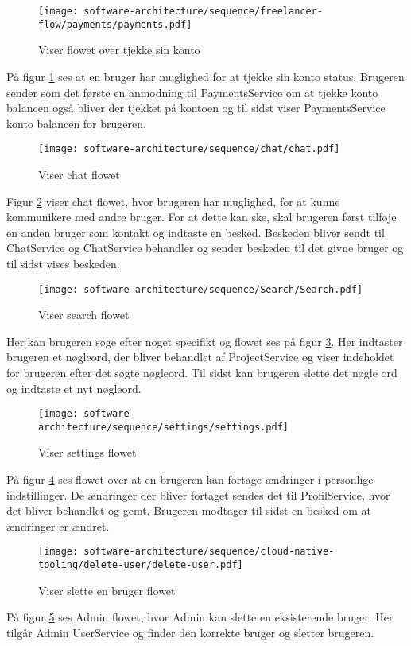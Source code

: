 \begin{figure}[H]
    \centering
\texttt{[image: software-architecture/sequence/freelancer-flow/payments/payments.pdf]}
\caption{Viser flowet over tjekke sin konto}
\label{fig:balance}
\end{figure}
På figur \ref{fig:balance} ses at en bruger har muglighed for at tjekke sin konto status. Brugeren sender som det første en anmodning til PaymentsService om at tjekke konto balancen også bliver der tjekket på kontoen og til sidst viser PaymentsService konto balancen for brugeren.
\begin{figure}[H]
    \centering
\texttt{[image: software-architecture/sequence/chat/chat.pdf]}
\caption{Viser chat flowet}
\label{fig:selectFriend}
\end{figure}
Figur \ref{fig:selectFriend} viser chat flowet, hvor brugeren har muglighed, for at kunne kommunikere med andre bruger. For at dette kan ske, skal brugeren først tilføje en anden bruger som kontakt og indtaste en besked. Beskeden bliver sendt til ChatService og ChatService behandler og sender beskeden til det givne bruger og til sidst vises beskeden. 

\begin{figure}[H]
    \centering
\texttt{[image: software-architecture/sequence/Search/Search.pdf]}
\caption{Viser search flowet}
\label{fig:search}
\end{figure}
Her kan brugeren søge efter noget specifikt og flowet ses på figur \ref{fig:search}. Her indtaster brugeren et nøgleord, der bliver behandlet af ProjectService og viser indeholdet for brugeren efter det søgte nøgleord. Til sidst kan brugeren slette det nøgle ord og indtaste et nyt nøgleord. 

\begin{figure}[H]
    \centering
\texttt{[image: software-architecture/sequence/settings/settings.pdf]}
\caption{Viser settings flowet}
\label{fig:settings}
\end{figure}
På figur \ref{fig:settings} ses flowet over at en brugeren kan fortage ændringer i personlige indstillinger. De ændringer der bliver fortaget sendes det til ProfilService, hvor det bliver behandlet og gemt. Brugeren modtager til sidst en besked om at ændringer er ændret.   

\begin{figure}[H]
    \centering
\texttt{[image: software-architecture/sequence/cloud-native-tooling/delete-user/delete-user.pdf]}
\caption{Viser slette en bruger flowet}
\label{fig:Adminflow}
\end{figure}
På figur \ref{fig:Adminflow} ses Admin flowet, hvor Admin kan slette en eksisterende bruger. Her tilgår Admin UserService og finder den korrekte bruger og sletter brugeren.

